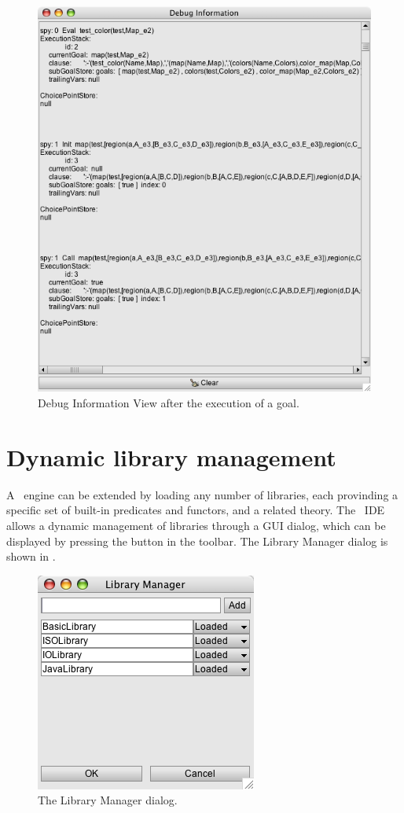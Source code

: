 \begin{figure}
\centering
\includegraphics[scale=0.605]{images/viewDebugInformation}
\caption{Debug Information View after the execution of a goal.}
\label{view-debug-information}
\end{figure}

\section{Dynamic library management}


A \tuprolog\ engine can be extended by loading any number of libraries, each provinding a specific set of built-in
predicates and functors, and a related theory. The \tuprolog\ IDE allows a dynamic management of libraries through a
GUI dialog, which can be displayed by pressing the  button in the toolbar. The Library
Manager dialog is shown in .

\begin{figure}
\centering
\includegraphics[scale=0.605]{images/libraryManagerDialog}
\caption{The Library Manager dialog.}
\label{library-manager-dialog}
\end{figure}

